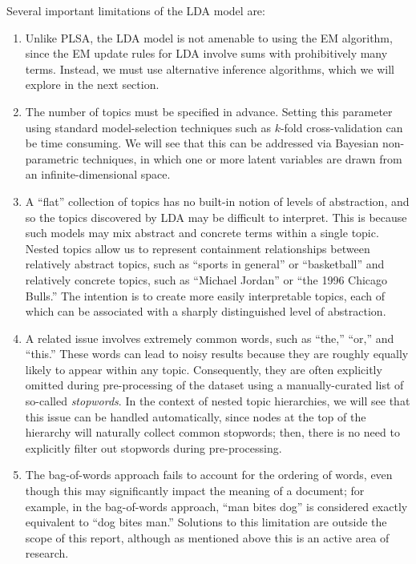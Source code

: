 \documentclass{article}
\begin{document}
Several important limitations of the LDA model are:
\begin{enumerate}
\item Unlike PLSA, the LDA model is not amenable to using the EM algorithm, since the EM update rules for LDA involve sums with prohibitively many terms.
Instead, we must use alternative inference algorithms, which we will explore in the next section.
\item The number of topics must be specified in advance.
Setting this parameter using standard model-selection techniques such as $k$-fold cross-validation can be time consuming.
We will see that this can be addressed via Bayesian non-parametric techniques, in which one or more latent variables are drawn from an infinite-dimensional space.
\item A ``flat'' collection of topics has no built-in notion of levels of abstraction, and so the topics discovered by LDA may be difficult to interpret.
This is because such models may mix abstract and concrete terms within a single topic.
Nested topics allow us to represent containment relationships between relatively abstract topics, such as ``sports in general'' or ``basketball'' and relatively concrete topics, such as ``Michael Jordan'' or ``the 1996 Chicago Bulls.''
The intention is to create more easily interpretable topics, each of which can be associated with a sharply distinguished level of abstraction.
\item A related issue involves extremely common words, such as ``the,'' ``or,'' and ``this.''
These words can lead to noisy results because they are roughly equally likely to appear within any topic.
Consequently, they are often explicitly omitted during pre-processing of the dataset using a manually-curated list of so-called \emph{stopwords}.
In the context of nested topic hierarchies, we will see that this issue can be handled automatically, since nodes at the top of the hierarchy will naturally collect common stopwords; then, there is no need to explicitly filter out stopwords during pre-processing.
\item The bag-of-words approach fails to account for the ordering of words, even though this may significantly impact the meaning of a document; for example, in the bag-of-words approach, ``man bites dog'' is considered exactly equivalent to ``dog bites man.''
Solutions to this limitation are outside the scope of this report, although as mentioned above this is an active area of research.
\end{enumerate}
\end{document}
